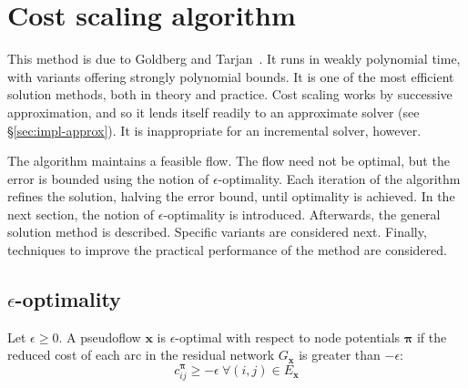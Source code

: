 \section{Cost scaling algorithm} \label{sec:impl-cost-scaling}

This method is due to Goldberg and Tarjan~\cite{Goldberg:1987}. It runs in weakly polynomial time, with variants offering strongly polynomial bounds. It is one of the most efficient solution methods, both in theory and practice\footnotemark. Cost scaling works by successive approximation, and so it lends itself readily to an approximate solver (see \S\ref{sec:impl-approx}). It is inappropriate for an incremental solver, however.

The algorithm maintains a feasible flow. The flow need not be optimal, but the error is bounded using the notion of $\epsilon$-optimality. Each iteration of the algorithm refines the solution, halving the error bound, until optimality is achieved. In the next section, the notion of $\epsilon$-optimality is introduced. Afterwards, the general solution method is described. Specific variants are considered next. Finally, techniques to improve the practical performance of the method are considered.

\subsection{$\epsilon$-optimality}

\begin{defn}
\label{defn:epsilon-optimality}
Let $\epsilon \geq 0$. A pseudoflow $\mathbf{x}$ is $\epsilon$-optimal with respect to node potentials $\boldsymbol{\pi}$ if the reduced cost of each arc in the residual network $G_\mathbf{x}$ is greater than $-\epsilon$:
\begin{equation} \label{eq:epsilon-optimality}
c^{\boldsymbol{\pi}}_{ij} \geq -\epsilon\:\forall (i,j) \in E_{\mathbf{x}}
\end{equation}
\end{defn}

